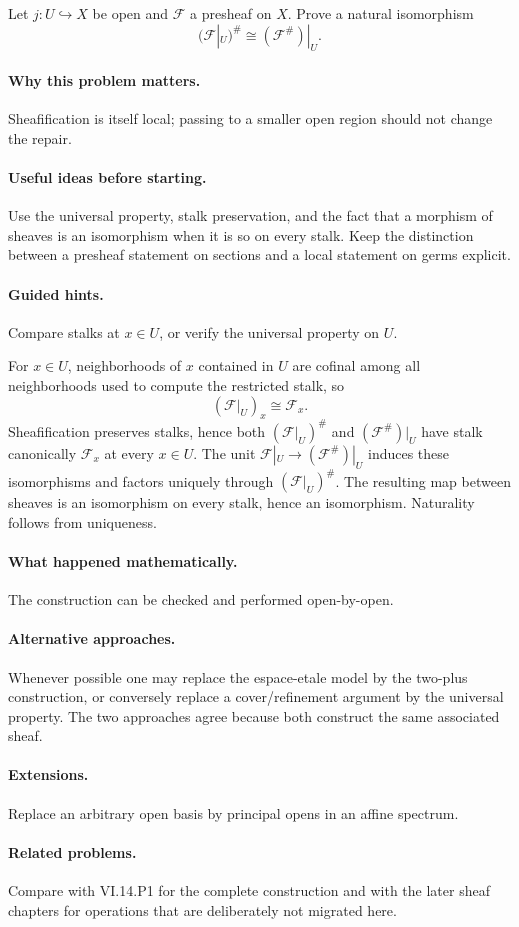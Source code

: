 \begin{problem}
Let $j:U\hookrightarrow X$ be open and $\mathcal F$ a presheaf on $X$. Prove a natural isomorphism
\[
(\mathcal F|_U)^\#\cong(\mathcal F^\#)|_U.
\]
\end{problem}

\paragraph{Why this problem matters.}
Sheafification is itself local; passing to a smaller open region should not change the repair.

\paragraph{Useful ideas before starting.}
Use the universal property, stalk preservation, and the fact that a morphism of sheaves is an isomorphism when it is so on every stalk.  Keep the distinction between a presheaf statement on sections and a local statement on germs explicit.

\paragraph{Guided hints.}
Compare stalks at $x\in U$, or verify the universal property on $U$.

\ifdefined\FullProblemDossiers
\begin{solution}
For $x\in U$, neighborhoods of $x$ contained in $U$ are cofinal among all neighborhoods used to compute the restricted stalk, so
\[
(\mathcal F|_U)_x\cong\mathcal F_x.
\]
Sheafification preserves stalks, hence both $(\mathcal F|_U)^\#$ and $(\mathcal F^\#)|_U$ have stalk canonically $\mathcal F_x$ at every $x\in U$. The unit $\mathcal F|_U\to(\mathcal F^\#)|_U$ induces these isomorphisms and factors uniquely through $(\mathcal F|_U)^\#$. The resulting map between sheaves is an isomorphism on every stalk, hence an isomorphism. Naturality follows from uniqueness.
\end{solution}

\paragraph{What happened mathematically.}
The construction can be checked and performed open-by-open.

\paragraph{Alternative approaches.}
Whenever possible one may replace the espace-etale model by the two-plus construction, or conversely replace a cover/refinement argument by the universal property.  The two approaches agree because both construct the same associated sheaf.

\paragraph{Extensions.}
Replace an arbitrary open basis by principal opens in an affine spectrum.

\paragraph{Related problems.}
Compare with VI.14.P1 for the complete construction and with the later sheaf chapters for operations that are deliberately not migrated here.
\fi
